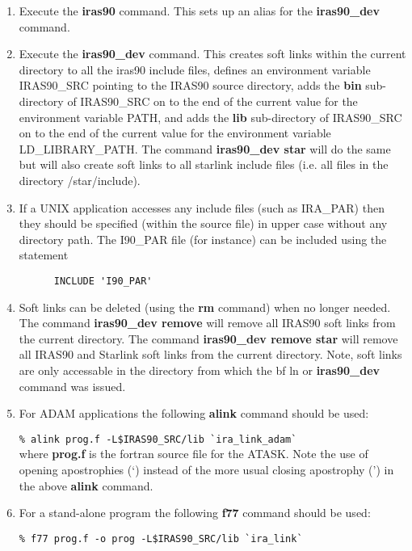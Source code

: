 \begin{enumerate}
\item Execute the {\bf iras90} command. This sets up an alias for the
{\bf iras90\_dev} command.

\item Execute the {\bf iras90\_dev} command.  This creates soft links
within the current directory to
all the iras90 include files, defines an environment variable IRAS90\_SRC
pointing to the IRAS90 source directory, adds the {\bf bin}
sub-directory of IRAS90\_SRC on to the end of the current value for the
environment variable PATH, and adds the {\bf lib} sub-directory of
IRAS90\_SRC on to the end of the current value for the environment
variable LD\_LIBRARY\_PATH. The command {\bf iras90\_dev star} will do
the same but will also create soft links to all starlink include files
(i.e. all files in the directory /star/include).

\item If a UNIX application accesses any include files (such as
IRA\_PAR) then they should be specified (within the source file) in upper case
without any directory
path. The I90\_PAR file (for instance) can be included using the statement

\verb+      INCLUDE 'I90_PAR'+\\

\item Soft links can be deleted (using the {\bf rm} command) when no longer
needed.
The command {\bf iras90\_dev remove} will remove all IRAS90 soft links from
the current directory. The command {\bf iras90\_dev remove star} will
remove all IRAS90 and Starlink soft links from the current directory.
Note, soft links are only accessable in the directory from which the {bf ln}
or {\bf iras90\_dev} command was issued.
\item For ADAM applications the following {\bf alink} command should be used:

\verb+% alink prog.f -L$IRAS90_SRC/lib `ira_link_adam`+\\

where {\bf prog.f} is the fortran source file for the ATASK.
Note the use of opening apostrophies (`) instead of the more usual closing
apostrophy (') in the above {\bf alink} command.

\item For a stand-alone program the following {\bf f77} command should be used:

\verb+% f77 prog.f -o prog -L$IRAS90_SRC/lib `ira_link`+\\
\end{enumerate}


